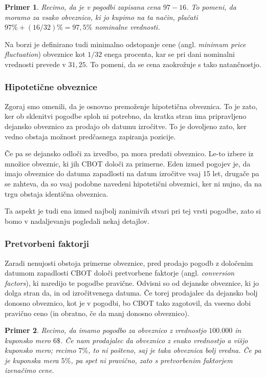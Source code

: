 \documentclass[a4paper, 11pt]{article}
\newtheorem{primer}{Primer}
\begin{document}
\begin{primer}
    Recimo, da je v pogodbi zapisana cena $97-16$. To pomeni, da moramo za vsako obveznico, ki jo kupimo 
    na ta način, plačati $97\% + (16/32)\% = 97,5\%$ nominalne vrednosti. 
\end{primer}

Na borzi je definirano tudi minimalno odstopanje cene (angl. \textit{minimum price fluctuation}) obveznice
kot $1/32$ enega procenta, kar se pri dani nominalni vrednosti prevede v \textdollar$31,25.$ To pomeni, da
se cena zaokrožuje s tako natančnostjo.

\subsubsection{Hipotetične obveznice}
Zgoraj smo omenili, da je osnovno premoženje hipotetična obveznica. To je zato, ker ob sklenitvi pogodbe 
sploh ni potrebno, da kratka stran ima pripravljeno dejansko obveznico za prodajo ob datumu izročitve.
To je dovoljeno zato, ker vedno obstaja možnost predčasnega zapiranja pozicije. 

Če pa se dejansko odloči za izvedbo, pa mora predati obveznico. Le-to izbere iz množice obveznic, ki jih
CBOT določi za primerne. Eden izmed pogojev je, da imajo obveznice do datuma zapadlosti na datum izročitve
vsaj 15 let, drugače pa se zahteva, da so vsaj podobne navedeni hipotetični obveznici, ker ni nujno, da na
trgu obstaja identična obveznica. 

Ta aspekt je tudi ena izmed najbolj zanimivih stvari pri tej vrsti pogodbe, zato si bomo v nadaljevanju 
pogledali nekaj detajlov.


\subsubsection{Pretvorbeni faktorji}
Zaradi nenujosti obstoja primerne obveznice, pred prodajo pogodb z določenim datumom zapadlosti CBOT 
določi pretvorbene faktorje (angl. \textit{conversion factors}), ki naredijo te pogodbe pravične. 
Odvisni so od dejanske obveznice, ki jo dolga stran da, in od izročitvenega datuma. Če torej prodajalec
da dejansko bolj donosno obveznico, kot je v pogodbi, bo CBOT tako zagotovil, da vseeno dobi pravično
ceno (in obratno, če da manj donosno obveznico).

\begin{primer}
    Recimo, da imamo pogodbo za obveznico z vrednostjo \textdollar$100.000$ in kuponsko mero $6\$$. 
    Če nam prodajalec da obveznico z enako vrednostjo a višjo kuponsko mero; recimo $7\%$, to ni 
    pošteno, saj je taka obveznica bolj vredna. Če pa je kuponska mera $5\%$, pa spet ni pravično, 
    zato s pretvorbenim faktorjem izenačimo cene.
\end{primer}
\end{document}
